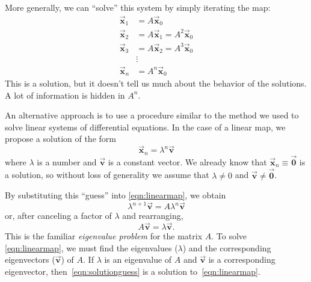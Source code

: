\documentclass[reqno]{immbook}
\newcommand{\BV}{\vec{\textbf{v}}}
\newcommand{\BX}{\vec{\textbf{x}}}
\newcommand{\BZero}{\vec{\textbf{0}}}  %
\numberwithin{equation}{chapter}
\numberwithin{question}{section}
\numberwithin{theorem}{chapter}
\numberwithin{figure}{chapter}
\theoremstyle{definition}
\begin{document}
More generally, we can ``solve'' this system by simply iterating the
map:
\begin{equation}
\begin{split}
  \BX_1 & = A\BX_0 \\
  \BX_2 & = A\BX_1 = A^2\BX_0 \\
  \BX_3 & = A\BX_2 = A^3\BX_0 \\
        & \vdots \\
  \BX_n & = A^n\BX_0
\end{split}
\end{equation}
This is a solution, but it doesn't tell us much about the
behavior of the solutions.  A lot of information is hidden
in $A^n$.

An alternative approach is to use a procedure similar to the
method we used to solve linear systems of differential equations.
In the case of a linear map, we propose a solution of the
form
\begin{equation}
   \BX_n = \lambda^n \BV
\label{eqn:solutionguess}
\end{equation}
where $\lambda$ is a number and $\BV$ is a constant vector.
We already know that $\BX_n\equiv\BZero$ is a solution, so without
loss of generality we assume that $\lambda\ne 0$ and
$\BV \ne \BZero$.

By substituting this ``guess'' into \eqref{eqn:linearmap},
we obtain
\begin{equation}
  \lambda^{n+1} \BV  = A\lambda^n\BV
\end{equation}
or, after canceling a factor of $\lambda$ and rearranging,
\begin{equation}
   A\BV = \lambda \BV.
\label{eqn:mapeigenvalueprob}
\end{equation}
This is the familiar \emph{eigenvalue problem}
for the matrix $A$.
To solve \eqref{eqn:linearmap}, we must find
the eigenvalues ($\lambda$) and
the corresponding eigenvectors ($\BV$) of $A$.
If $\lambda$ is an eigenvalue of $A$ and $\BV$ is a corresponding
eigenvector, then~\eqref{eqn:solutionguess} is a solution
to~\eqref{eqn:linearmap}.
\end{document}
